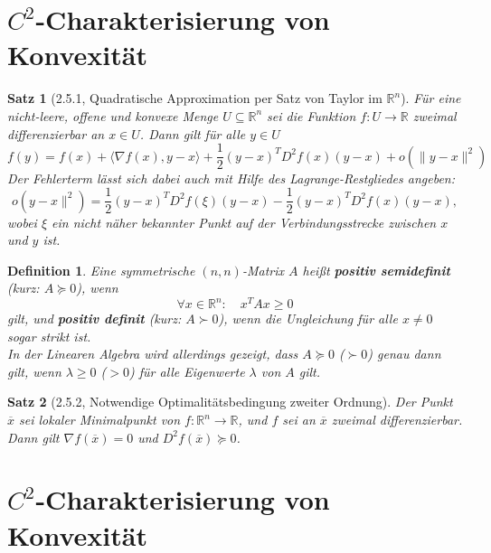 \documentclass[12pt]{extreport} %
\newcommand{\R}{\mathbb{R}}
\theoremstyle{named}
\theoremstyle{nnamed}
\theoremstyle{itshape}
\newtheorem*{satz}{Satz}
\newtheorem*{definition}{Definition}
\theoremstyle{normal}
\begin{document}
\section{$C^2$-Charakterisierung von Konvexität}

\begin{satz}[2.5.1, Quadratische Approximation per Satz von Taylor im $\R^n$]
	Für eine nicht-leere, offene und konvexe Menge $U \subseteq \R^n$ sei die Funktion $f \colon U \rightarrow \R$ zweimal differenzierbar an $x \in U$. Dann gilt für alle $y \in U$
	$$ f(y) = f(x) + \langle \nabla f(x), y - x \rangle + \frac{1}{2} \left( y - x \right)^T D^2 f(x) (y - x) + o\left( \| y - x \|^2 \right) $$	
	Der Fehlerterm lässt sich dabei auch mit Hilfe des Lagrange-Restgliedes angeben:
	$$ o\left( y - x \|^2 \right) = \frac{1}{2} \left( y - x \right)^T D^2 f(\xi) (y - x ) - \frac{1}{2} \left(y - x \right)^T D^2 f(x) (y -x ), $$
	wobei $\xi$ ein nicht näher bekannter Punkt auf der Verbindungsstrecke zwischen $x$ und $y$ ist.
\end{satz}

\begin{definition}
	Eine symmetrische $(n, n)$-Matrix $A$ heißt \textbf{positiv semidefinit} (kurz: $A \succeq 0$), wenn
	$$ \forall x \in \R^n: \quad x^T A x \geq 0 $$
	gilt, und \textbf{positiv definit} (kurz: $A \succ 0$), wenn die Ungleichung für alle $x \neq 0$ sogar strikt ist. ~\\
	
	In der Linearen Algebra wird allerdings gezeigt, dass $A \succeq 0$ ($\succ 0$) genau dann gilt, wenn $\lambda \geq 0$ ($> 0$) für alle Eigenwerte $\lambda$ von $A$ gilt. 
\end{definition}

\begin{satz}[2.5.2, Notwendige Optimalitätsbedingung zweiter Ordnung]
	Der Punkt $\overline{x}$ sei lokaler Minimalpunkt von $f \colon \R^n \rightarrow \R$, und $f$ sei an $\overline{x}$ zweimal differenzierbar. Dann gilt $\nabla f(\overline{x}) = 0$ und $D^2 f(\overline{x}) \succeq 0$.
\end{satz}

\section{$C^2$-Charakterisierung von Konvexität}
\end{document}
